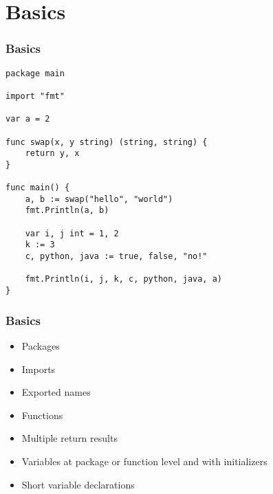 \section{Basics}
\begin{frame}[fragile]
\frametitle{Basics}

\begin{lstlisting}
package main

import "fmt"

var a = 2

func swap(x, y string) (string, string) {
    return y, x
}

func main() {
    a, b := swap("hello", "world")
    fmt.Println(a, b)

    var i, j int = 1, 2
    k := 3
    c, python, java := true, false, "no!"

    fmt.Println(i, j, k, c, python, java, a)
}
\end{lstlisting}
\end{frame}

\begin{frame}
\frametitle{Basics}

	\begin{itemize}
		\item Packages
		\item Imports
		\item Exported names
		\item Functions
		\item Multiple return results
		\item Variables at package or function level and with initializers
		\item Short variable declarations
	\end{itemize}

\end{frame}


